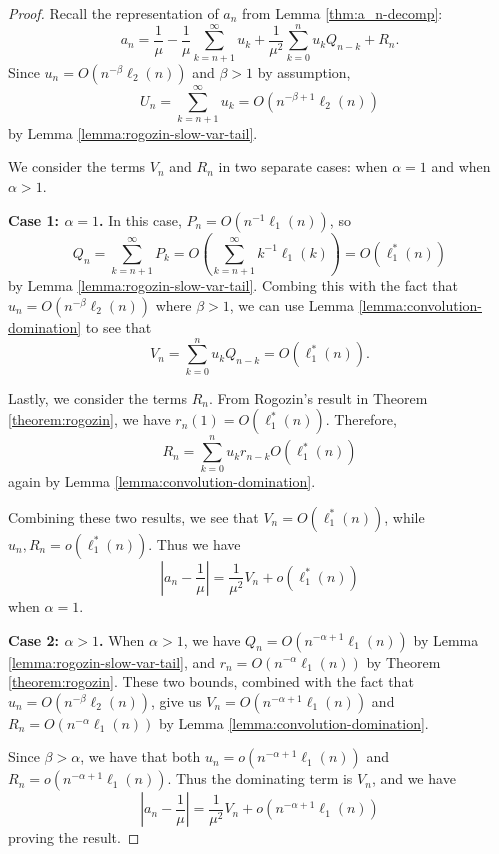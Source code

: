 \begin{proof}
    Recall the representation of $a_n$ from Lemma \ref{thm:a_n-decomp}:
    \[
       a_n = \frac{1}{\mu}
           - \frac{1}{\mu}\sum_{k=n+1}^\infty u_k
           + \frac{1}{\mu^2} \sum_{k=0}^n u_k Q_{n-k}
           + R_n.
    \]
    Since $u_n =  O(n^{-\beta}\ell_2(n))$ and $\beta > 1$ by assumption,
    \[
        U_n = \sum_{k=n+1}^\infty u_k = O(n^{-\beta+1}\ell_2(n))
    \]
    by Lemma \ref{lemma:rogozin-slow-var-tail}.

    We consider the terms $V_n$ and $R_n$ in two separate cases: when $\alpha = 1$ and when $\alpha > 1$.

    \textbf{Case 1: $\alpha = 1$.}
    In this case, $P_n = O(n^{-1}\ell_1(n))$,
    so
    \[
        Q_n = \sum_{k=n+1}^\infty P_k = O\left(\sum_{k=n+1}^\infty k^{-1}\ell_1(k)\right) = O(\ell_1^*(n))
    \]
    by Lemma \ref{lemma:rogozin-slow-var-tail}.
    Combing this with the fact that $u_n = O(n^{-\beta}\ell_2(n))$ where $\beta > 1$,
    we can use Lemma \ref{lemma:convolution-domination} to see that
    \[
        V_n = \sum_{k=0}^n u_k Q_{n-k} = O(\ell_1^*(n)).
    \]

    Lastly, we consider the terms $R_n$.
    From Rogozin's result in Theorem \ref{theorem:rogozin},
    we have $r_n(1) = O(\ell_1^*(n))$.
    Therefore,
    \[
        R_n = \sum_{k=0}^n u_k r_{n-k}O(\ell_1^*(n))
    \]
    again by Lemma \ref{lemma:convolution-domination}.

    Combining these two results,
    we see that $V_n = O(\ell_1^*(n))$, while $u_n, R_n = o(\ell_1^*(n))$.
    Thus we have
    \[
        \left|a_n - \frac{1}{\mu}\right| = \frac{1}{\mu^2}V_n + o\left(\ell_1^*(n)\right)
    \]
    when $\alpha = 1$.

    \textbf{Case 2: $\alpha > 1$.}
    When $\alpha > 1$, we have $Q_n = O(n^{-\alpha+1}\ell_1(n))$ by Lemma \ref{lemma:rogozin-slow-var-tail},
    and $r_n = O(n^{-\alpha}\ell_1(n))$ by Theorem \ref{theorem:rogozin}.
    These two bounds, combined with the fact that $u_n = O(n^{-\beta}\ell_2(n))$, give us
    $V_n = O(n^{-\alpha+1}\ell_1(n))$ and $R_n = O(n^{-\alpha}\ell_1(n))$ by Lemma \ref{lemma:convolution-domination}.
    
    Since $\beta > \alpha$,
    we have that both $u_n = o(n^{-\alpha+1}\ell_1(n))$ and $R_n = o(n^{-\alpha+1}\ell_1(n))$.
    Thus the dominating term is $V_n$, and we have
    \[
        \left|a_n - \frac{1}{\mu}\right| = \frac{1}{\mu^2}V_n + o\left(n^{-\alpha+1}\ell_1(n)\right)
    \]
    proving the result.
\end{proof}


